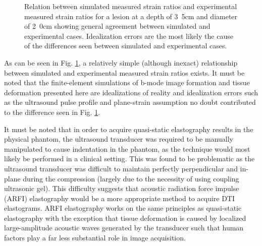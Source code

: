 			\begin{figure}[!t]
				\centering
				\caption{Relation between simulated measured strain ratios and experimental measured strain ratios for a lesion at a depth of \unit{3.5}{cm} and diameter of \unit{2.0}{cm} showing general agreement between simulated and experimental cases. Idealization errors are the most likely the cause of the differences seen between simulated and experimental cases.}
				\label{fig:phantom_validation}
			\end{figure}

			As can be seen in Fig. \ref{fig:phantom_validation}, a relatively simple (although inexact) relationship between simulated and experimental measured strain ratios exists. It must be noted that the finite-element simulations of b-mode image formation and tissue deformation presented here are idealizations of reality and idealization errors such as the ultrasound pulse profile and plane-strain assumption no doubt contributed to the difference seen in Fig. \ref{fig:phantom_validation}.

			It must be noted that in order to acquire quasi-static elastography results in the physical phantom, the ultrasound transducer was required to be manually manipulated to cause indentation in the phantom, as the technique would most likely be performed in a clinical setting. This was found to be problematic as the ultrasound transducer was difficult to maintain perfectly perpendicular and in-plane during the compression (largely due to the necessity of using coupling ultrasonic gel). This difficulty suggests that acoustic radiation force impulse (ARFI) elastography would be a more appropriate method to acquire DTI elastograms. ARFI elastography works on the same principles as quasi-static elastography with the exception that tissue deformation is caused by localized large-amplitude acoustic waves generated by the transducer such that human factors play a far less substantial role in image acquisition.

	
	